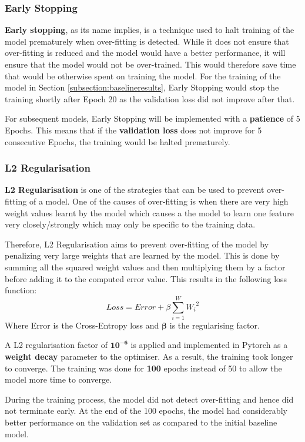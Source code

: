 \documentclass[sigconf,nonacm=true]{acmart}
\begin{document}
\subsubsection{Early Stopping}
\textbf{Early stopping}, as its name implies, is a technique used to halt training of the model prematurely when over-fitting is detected. While it does not ensure that over-fitting is reduced and the model would have a better performance, it will ensure that the model would not be over-trained. This would therefore save time that would be otherwise spent on training the model. For the training of the model in Section \ref{subsection:baselineresults}, Early Stopping would stop the training shortly after Epoch 20 as the validation loss did not improve after that.

For subsequent models, Early Stopping will be implemented with a \textbf{patience} of 5 Epochs. This means that if the \textbf{validation loss} does not improve for 5 consecutive Epochs, the training would be halted prematurely.

\subsubsection{L2 Regularisation}
\textbf{L2 Regularisation} is one of the strategies that can be used to prevent over-fitting of a model. One of the causes of over-fitting is when there are very high weight values learnt by the model which causes a the model to learn one feature very closely/strongly which may only be specific to the training data. 

Therefore, L2 Regularisation aims to prevent over-fitting of the model by penalizing very large weights that are learned by the model. This is done by summing all the squared weight values and then multiplying them by a factor before adding it to the computed error value. This results in the following loss function:
\begin{displaymath}
Loss = Error + \beta\sum_{i=1}^{W}{W_{i}}^{2}
\end{displaymath}
Where Error is the Cross-Entropy loss and \(\mathbf{\beta}\) is the regularising factor.

A L2 regularisation factor of \(\mathbf{10^{-6}}\) is applied and implemented in Pytorch as a \textbf{weight decay} parameter to the optimiser. As a result, the training took longer to converge. The training was done for \textbf{100} epochs instead of 50 to allow the model more time to converge. 

During the training process, the model did not detect over-fitting and hence did not terminate early. At the end of the 100 epochs, the model had considerably better performance on the validation set as compared to the initial baseline model.
\end{document}
